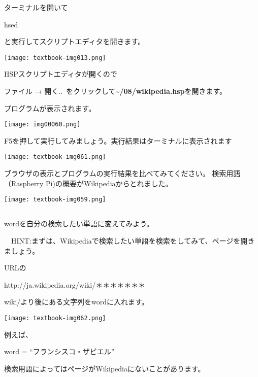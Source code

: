 ターミナルを開いて

hsed

と実行してスクリプトエディタを開きます。



\begin{center}
  \texttt{[image: textbook-img013.png]}
\end{center}

\clearpage
HSPスクリプトエディタが開くので

\bigskip

ファイル → 開く..\ をクリックして\textbf{{\textasciitilde}/08/wikipedia.hsp}を開きます。

プログラムが表示されます。

\begin{center}
  \texttt{[image: img00060.png]}
\end{center}

\clearpage
F5を押して実行してみましょう。実行結果はターミナルに表示されます
\begin{center}
  \texttt{[image: textbook-img061.png]}
\end{center}
ブラウザの表示とプログラムの実行結果を比べてみてください。
検索用語（Raspberry
Pi)の概要がWikipediaからとれました。

\begin{center}
  \texttt{[image: textbook-img059.png]}
\end{center}

\subsection*{\theQuestion\label{Q:wikipedia}}
wordを自分の検索したい単語に変えてみよう。

\ \ HINT:まずは、Wikipediaで検索したい単語を検索をしてみて、ページを開きましょう。

URLの

http://ja.wikipedia.org/wiki/＊＊＊＊＊＊＊

wiki/より後にある文字列をwordに入れます。
\begin{center}
  \texttt{[image: textbook-img062.png]}
\end{center}
例えば、

word = “フランシスコ・ザビエル”

検索用語によってはページがWikipediaにないことがあります。
